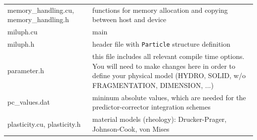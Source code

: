 \documentclass[10pt,fleqn,twoside]{article}
\begin{document}
\begin{table}
\begin{tabular}[b]{p{6cm} p{9cm}}
  memory\_handling.cu, memory\_handling.h                       & functions for memory allocation and copying between host and device                                                                                                                                                                                                                                                                                        \\
  miluph.cu                                                     & main                                                                                                                                                                                                                                                                                                                                                       \\
  miluph.h                                                      & header file with \verb|Particle| structure definition                                                                                                                                                                                                                                                                                              \\
  parameter.h                                                   & this file includes all relevant compile time options. You will need to make changes here in order to define your physical model (HYDRO, SOLID, w/o FRAGMENTATION, DIMENSION, ...)                                                                                                                                                                          \\
  pc\_values.dat                                                & mininum absolute values, which are needed for the predictor-corrector integration schemes                                                                                                                                                                                                                                                                  \\
  plasticity.cu, plasticity.h                                   & material models (rheology): Drucker-Prager, Johnson-Cook, von Mises                                                                                                                                                                                                                                                                                        \\

\end{tabular}
\end{table}
\end{document}
